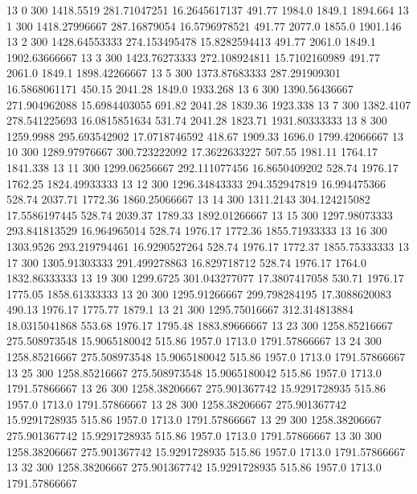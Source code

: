 13  0  300  1418.5519  281.71047251  16.2645617137  491.77  1984.0  1849.1  1894.664 
13  1  300  1418.27996667  287.16879054  16.5796978521  491.77  2077.0  1855.0  1901.146 
13  2  300  1428.64553333  274.153495478  15.8282594413  491.77  2061.0  1849.1  1902.63666667 
13  3  300  1423.76273333  272.108924811  15.7102160989  491.77  2061.0  1849.1  1898.42266667 
13  5  300  1373.87683333  287.291909301  16.5868061171  450.15  2041.28  1849.0  1933.268 
13  6  300  1390.56436667  271.904962088  15.6984403055  691.82  2041.28  1839.36  1923.338 
13  7  300  1382.4107  278.541225693  16.0815851634  531.74  2041.28  1823.71  1931.80333333 
13  8  300  1259.9988  295.693542902  17.0718746592  418.67  1909.33  1696.0  1799.42066667 
13  10  300  1289.97976667  300.723222092  17.3622633227  507.55  1981.11  1764.17  1841.338 
13  11  300  1299.06256667  292.111077456  16.8650409202  528.74  1976.17  1762.25  1824.49933333 
13  12  300  1296.34843333  294.352947819  16.994475366  528.74  2037.71  1772.36  1860.25066667 
13  14  300  1311.2143  304.124215082  17.5586197445  528.74  2039.37  1789.33  1892.01266667 
13  15  300  1297.98073333  293.841813529  16.964965014  528.74  1976.17  1772.36  1855.71933333 
13  16  300  1303.9526  293.219794461  16.9290527264  528.74  1976.17  1772.37  1855.75333333 
13  17  300  1305.91303333  291.499278863  16.829718712  528.74  1976.17  1764.0  1832.86333333 
13  19  300  1299.6725  301.043277077  17.3807417058  530.71  1976.17  1775.05  1858.61333333 
13  20  300  1295.91266667  299.798284195  17.3088620083  490.13  1976.17  1775.77  1879.1 
13  21  300  1295.75016667  312.314813884  18.0315041868  553.68  1976.17  1795.48  1883.89666667 
13  23  300  1258.85216667  275.508973548  15.9065180042  515.86  1957.0  1713.0  1791.57866667 
13  24  300  1258.85216667  275.508973548  15.9065180042  515.86  1957.0  1713.0  1791.57866667 
13  25  300  1258.85216667  275.508973548  15.9065180042  515.86  1957.0  1713.0  1791.57866667 
13  26  300  1258.38206667  275.901367742  15.9291728935  515.86  1957.0  1713.0  1791.57866667 
13  28  300  1258.38206667  275.901367742  15.9291728935  515.86  1957.0  1713.0  1791.57866667 
13  29  300  1258.38206667  275.901367742  15.9291728935  515.86  1957.0  1713.0  1791.57866667 
13  30  300  1258.38206667  275.901367742  15.9291728935  515.86  1957.0  1713.0  1791.57866667 
13  32  300  1258.38206667  275.901367742  15.9291728935  515.86  1957.0  1713.0  1791.57866667 

